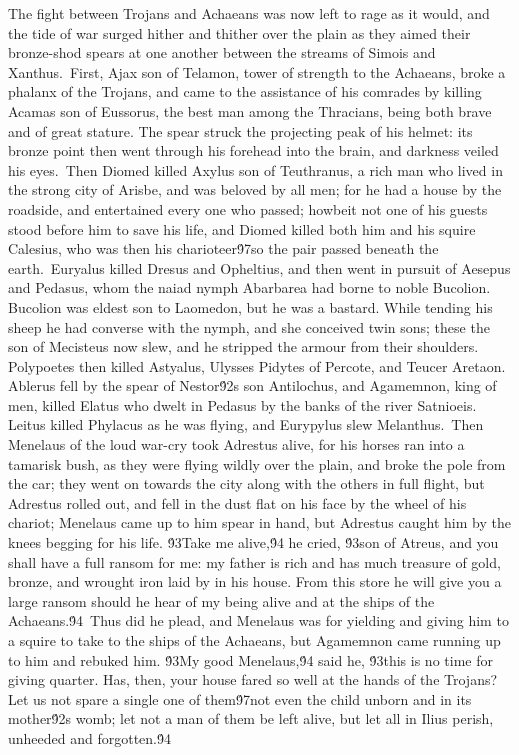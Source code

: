 {  The fight between Trojans and Achaeans was now left to rage as it would, and the tide of war surged hither and thither over the plain as they aimed their bronze-shod spears at one another between the streams of Simois and Xanthus.\
First, Ajax son of Telamon, tower of strength to the Achaeans, broke a phalanx of the Trojans, and came to the assistance of his comrades by killing Acamas son of Eussorus, the best man among the Thracians, being both brave and of great stature. The spear struck the projecting peak of his helmet: its bronze point then went through his forehead into the brain, and darkness veiled his eyes.\
Then Diomed killed Axylus son of Teuthranus, a rich man who lived in the strong city of Arisbe, and was beloved by all men; for he had a house by the roadside, and entertained every one who passed; howbeit not one of his guests stood before him to save his life, and Diomed killed both him and his squire Calesius, who was then his charioteer\'97so the pair passed beneath the earth.\
Euryalus killed Dresus and Opheltius, and then went in pursuit of Aesepus and Pedasus, whom the naiad nymph Abarbarea had borne to noble Bucolion. Bucolion was eldest son to Laomedon, but he was a bastard. While tending his sheep he had converse with the nymph, and she conceived twin sons; these the son of Mecisteus now slew, and he stripped the armour from their shoulders. Polypoetes then killed Astyalus, Ulysses Pidytes of Percote, and Teucer Aretaon. Ablerus fell by the spear of Nestor\'92s son Antilochus, and Agamemnon, king of men, killed Elatus who dwelt in Pedasus by the banks of the river Satnioeis. Leitus killed Phylacus as he was flying, and Eurypylus slew Melanthus.\
Then Menelaus of the loud war-cry took Adrestus alive, for his horses ran into a tamarisk bush, as they were flying wildly over the plain, and broke the pole from the car; they went on towards the city along with the others in full flight, but Adrestus rolled out, and fell in the dust flat on his face by the wheel of his chariot; Menelaus came up to him spear in hand, but Adrestus caught him by the knees begging for his life. \'93Take me alive,\'94 he cried, \'93son of Atreus, and you shall have a full ransom for me: my father is rich and has much treasure of gold, bronze, and wrought iron laid by in his house. From this store he will give you a large ransom should he hear of my being alive and at the ships of the Achaeans.\'94\
Thus did he plead, and Menelaus was for yielding and giving him to a squire to take to the ships of the Achaeans, but Agamemnon came running up to him and rebuked him. \'93My good Menelaus,\'94 said he, \'93this is no time for giving quarter. Has, then, your house fared so well at the hands of the Trojans? Let us not spare a single one of them\'97not even the child unborn and in its mother\'92s womb; let not a man of them be left alive, but let all in Ilius perish, unheeded and forgotten.\'94\
}
